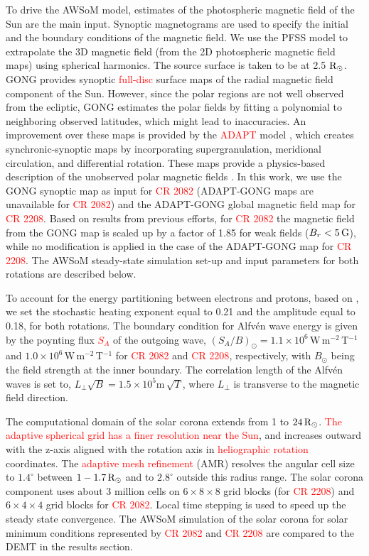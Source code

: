 \documentclass[namedreferences]{solarphysics}
\def\edit#1{\textcolor{Red}{#1}}
\newcommand{\mdeg}{^\circ}
\newcommand{\mrsun}{{\rm R_\odot}}
\begin{document}
\begin{article}
To drive {the AWSoM model, estimates} of the photospheric magnetic field of the Sun {are the main} input. Synoptic magnetograms are used to specify the initial and the boundary conditions of the {magnetic field.} We use the PFSS model to extrapolate the 3D magnetic field (from the 2D photospheric magnetic field maps) using spherical harmonics. The source surface is taken to be at 2.5 $\mrsun$. GONG provides synoptic \edit{full-disc} surface maps of the radial magnetic field component of the Sun. However, since the polar regions are not well observed from the ecliptic, GONG estimates the polar fields by fitting a polynomial to neighboring observed latitudes, which might lead to inaccuracies. An improvement over these maps is provided by the \edit{ADAPT} model \citep{Wor2000}, which creates synchronic-synoptic maps by incorporating supergranulation, meridional circulation, and differential rotation. These maps provide a physics-based description of the unobserved polar magnetic fields \citep{Arg2010, Hen2012}. In this work, we use the GONG synoptic map as input for \edit{CR 2082} (ADAPT-GONG maps are unavailable for \edit{CR 2082}) and the ADAPT-GONG global magnetic field map for \edit{CR 2208}. {Based on results from previous efforts, for \edit{CR 2082}} the magnetic field from the GONG map is scaled up by a factor of 1.85 {for weak fields ($B_r< 5\,\rm{G}$), while no modification is applied in the case of} the ADAPT-GONG map for \edit{CR 2208}. The AWSoM steady-state simulation set-up and input parameters for both rotations are described below. 

To account for the energy partitioning between electrons and protons, based on \citet{Cha2011}, we set the stochastic heating exponent {equal to} 0.21 and the amplitude equal to {0.18, for both} rotations. The boundary condition for Alfv\'{e}n wave energy is given by the {poynting flux \edit{$S_{A}$}} of the outgoing {wave, $({S_{A}/}{B})_{\odot} = 1.1\times 10^{6}$\,W\,m$^{-2}$\,T$^{-1}$ and $1.0\times 10^{6}$\,W\,m$^{-2}$\,T$^{-1}$ for \edit{CR 2082} and \edit{CR 2208}, respectively, with $B_{\odot}$ being the field} strength at the inner boundary. The correlation length of the Alfv\'{e}n waves is set {to, $L_{\perp} \sqrt{B} = 1.5 \times 10^{5}$m\,$\sqrt{T}$}{, where $L_{\perp}$ is transverse to the magnetic field direction.}

{The computational domain of the solar corona} extends from 1 to {$24\,\mrsun$}. \edit{The adaptive spherical grid has a finer resolution near the Sun}, and increases outward with the z-axis aligned with the rotation axis in \edit{heliographic rotation} coordinates. The \edit{adaptive mesh refinement} (AMR) resolves the angular cell size to $1.4\mdeg$ between $1 - 1.7\,\mrsun$ and to $2.8\mdeg$ outside this radius range. The solar corona component uses about 3 million cells on $6 \times 8 \times 8$ grid blocks (for \edit{CR 2208}) and $6 \times 4 \times 4$ grid blocks for \edit{CR 2082}. Local time stepping is used to speed up the steady state convergence. {The AWSoM simulation of the solar corona for solar minimum conditions represented by \edit{CR 2082} and \edit{CR 2208} are compared to the DEMT in the results section.}


\end{article}
\end{document}
